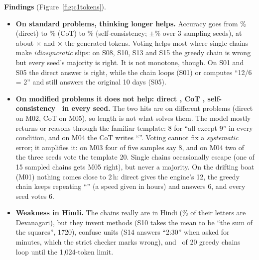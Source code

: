 \textbf{Findings} (Figure~\ref{fig:c1tokens}).
\begin{itemize}[leftmargin=*,nosep]
\item \textbf{On standard problems, thinking longer helps.} Accuracy goes from \CDirectStd\% (direct) to \CCotStd\% (CoT) to \CScStd\% (self-consistency; \CScStdMean$\pm$\CScStdSd\% over 3 sampling seeds), at about \CCotTokRatio$\times$ and \CScTokRatio$\times$ the generated tokens. Voting helps most where single chains make \emph{idiosyncratic} slips: on S08, S10, S13 and S15 the greedy chain is wrong but every seed's majority is right. It is not monotone, though. On S01 and S05 the direct answer is right, while the chain loops (S01) or computes ``12/6 = 2'' and still answers the original 10 days (S05).
\item \textbf{On modified problems it does not help: direct \CDirectModN, CoT \CCotModN, self-consistency \CScModN\ in every seed.} The two hits are on different problems (direct on M02, CoT on M05), so length is not what solves them. The model mostly returns or reasons through the familiar template: 8 for ``all except 9'' in every condition, and on M04 the CoT writes ``''. Voting cannot fix a \emph{systematic} error; it amplifies it: on M03 four of five samples say 8, and on M04 two of the three seeds vote the template 20. Single chains occasionally escape (one of 15 sampled chains gets M05 right), but never a majority. On the drifting boat (M01) nothing comes close to 2\,h: direct gives the engine's 12, the greedy chain keeps repeating ``'' (a speed given in hours) and answers 6, and every seed votes 6.
\item \textbf{Weakness in Hindi.} The chains really are in Hindi (\CDeva\% of their letters are Devanagari), but they invent methods (S10 takes the mean to be ``the sum of the squares'', 1720), confuse units (S14 answers ``2:30'' when asked for minutes, which the strict checker marks wrong), and \CCotTrunc\ of 20 greedy chains loop until the 1,024-token limit.
\end{itemize}

